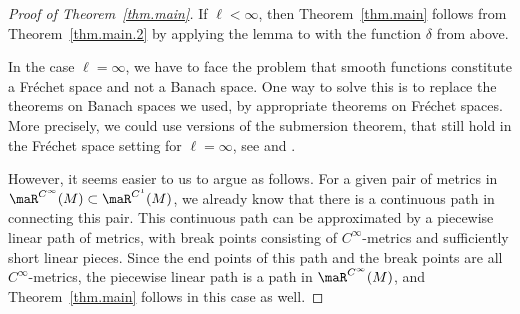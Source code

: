 \begin{proof}[Proof of Theorem~\ref{thm.main}]
If $\ell < \infty$, then Theorem~\ref{thm.main} follows from Theorem~\ref{thm.main.2} by applying the lemma to  with the function $\delta$ from above.

In the case $\ell = \infty$, we have to face the problem that smooth functions constitute a Fr\'echet space and not a Banach space. One way to solve this is to replace the theorems on Banach spaces we used, by appropriate theorems on Fr\'echet spaces. More precisely, we could use versions of the submersion theorem, that still hold in the Fr\'echet space setting for $\ell=\infty$, see \cite[Proposition~III.11]{neeb.wagemann} and \cite[around Theorem~D]{gloeckner}.

However, it seems easier to us to argue as follows.
For a given pair of metrics in $\smash{\maR^{C^\infty}(M)}\subset\smash{\maR^{C^1}(M)}$, we already know
that there is a continuous path in  connecting this pair.
This continuous path can be approximated by a piecewise linear path of metrics, with break points consisting of $C^\infty$-metrics and sufficiently short linear pieces. Since the end points of this path and the break points are all $C^\infty$-metrics, the piecewise linear path is a path in $\maR^{C^\infty}(M)$, and Theorem~\ref{thm.main} follows in this case as well.
\end{proof}
